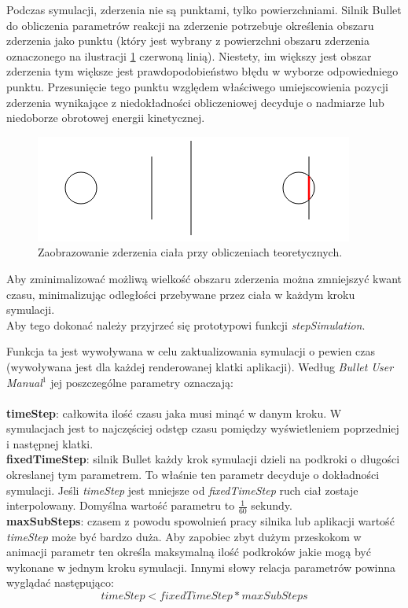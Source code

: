 Podczas symulacji, zderzenia nie są punktami, tylko powierzchniami.
Silnik Bullet do obliczenia parametrów reakcji na zderzenie potrzebuje
określenia obszaru zderzenia jako punktu (który jest wybrany z powierzchni
obszaru zderzenia oznaczonego na ilustracji \ref{fig:zderzenie2} czerwoną
linią). Niestety, im większy jest obszar zderzenia tym większe jest
prawdopodobieństwo błędu w wyborze odpowiedniego punktu. Przesunięcie tego
punktu względem właściwego umiejscowienia pozycji zderzenia wynikające z
niedokładności obliczeniowej decyduje o nadmiarze lub niedoborze obrotowej
energii kinetycznej.

\begin{figure}[H]
\centering
\includegraphics{./img/zderzenie2.png}
\caption{Zaobrazowanie zderzenia ciała przy obliczeniach teoretycznych.}
\label{fig:zderzenie2}
\end{figure}

Aby zminimalizować możliwą wielkość obszaru zderzenia można zmniejszyć kwant
czasu, minimalizując odległości przebywane przez ciała w każdym kroku
symulacji.\\
Aby tego dokonać należy przyjrzeć się prototypowi funkcji \emph{stepSimulation}.



Funkcja ta jest wywoływana w celu zaktualizowania symulacji o pewien
czas (wywoływana jest dla każdej renderowanej klatki aplikacji). Według
\emph{Bullet User Manual}$ ^{1} $ jej poszczególne
parametry oznaczają:\\
\\
\textbf{timeStep}: całkowita ilość czasu jaka musi minąć w danym kroku. W
symulacjach jest to najczęściej odstęp czasu pomiędzy wyświetleniem poprzedniej
i następnej klatki.\\
\textbf{fixedTimeStep}: silnik Bullet każdy krok symulacji dzieli na podkroki o
długości okreslanej tym parametrem. To właśnie ten parametr decyduje o
dokładności symulacji. Jeśli \emph{timeStep} jest mniejsze od
\emph{fixedTimeStep} ruch ciał zostaje interpolowany. Domyślna wartość parametru
to $ \frac{1}{60} $ sekundy.\\
\textbf{maxSubSteps}: czasem z powodu spowolnień pracy silnika lub aplikacji
wartość \emph{timeStep} może być bardzo duża. Aby zapobiec zbyt dużym przeskokom
w animacji parametr ten określa maksymalną ilość podkroków jakie mogą być
wykonane w jednym kroku symulacji. Innymi słowy relacja parametrów powinna
wyglądać następująco:\\
\begin{equation}
timeStep < fixedTimeStep * maxSubSteps
\end{equation}

